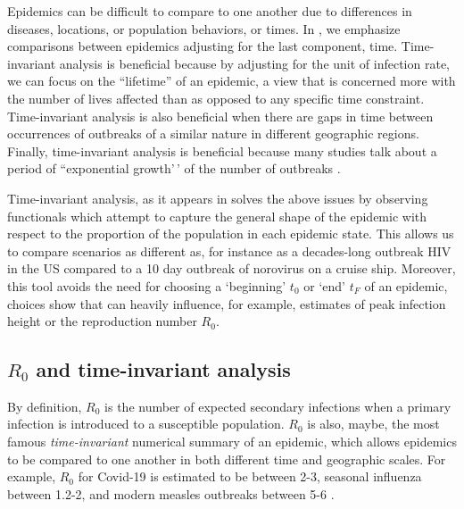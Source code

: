 \documentclass[
  shortnames]{jss}
\begin{document}
Epidemics can be difficult to compare to one another due to differences
in diseases, locations, or population behaviors, or times. In
, we emphasize comparisons between epidemics adjusting
for the last component, time. Time-invariant analysis is beneficial
because by adjusting for the unit of infection rate, we can focus on the
``lifetime'' of an epidemic, a view that is concerned more with the
number of lives affected than as opposed to any specific time
constraint. Time-invariant analysis is also beneficial when there are
gaps in time between occurrences of outbreaks of a similar nature in
different geographic regions. Finally, time-invariant analysis is
beneficial because many studies talk about a period of ``exponential
growth'\,' of the number of outbreaks
\citep{chowell2007,wallinga2007generation,forsberg2008}.

Time-invariant analysis, as it appears in  solves the
above issues by observing functionals which attempt to capture the
general shape of the epidemic with respect to the proportion of the
population in each epidemic state. This allows us to compare scenarios
as different as, for instance as a decades-long outbreak HIV in the US
compared to a 10 day outbreak of norovirus on a cruise ship. Moreover,
this tool avoids the need for choosing a `beginning' \(t_0\) or `end'
\(t_F\) of an epidemic, choices \cite{gallagher2020} show that can
heavily influence, for example, estimates of peak infection height or
the reproduction number \(R_0\).

\subsection[r0]{\(R_0\) and time-invariant analysis}\label{r0}

By definition, \(R_0\) is the number of expected secondary infections
when a primary infection is introduced to a susceptible population.
\(R_0\) is also, maybe, the most famous \textit{time-invariant}
numerical summary of an epidemic, which allows epidemics to be compared
to one another in both different time and geographic scales. For
example, \(R_0\) for Covid-19 is estimated to be between 2-3, seasonal
influenza between 1.2-2, and modern measles outbreaks between 5-6
\citep{midas2020,biggerstaff2014,namee2018}.
\end{document}
